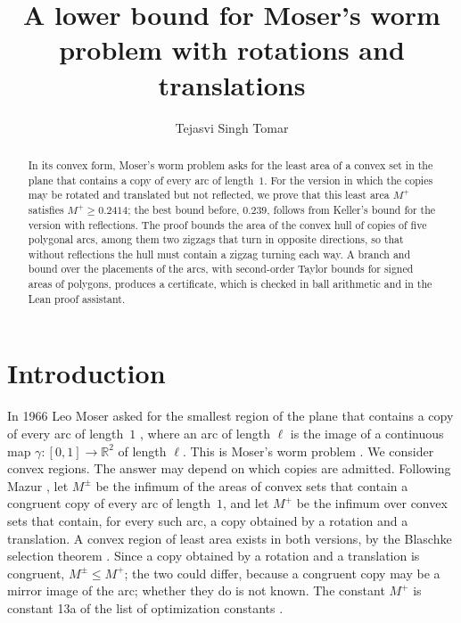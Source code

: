 \documentclass[11pt]{amsart}
\theoremstyle{definition}
\theoremstyle{remark}
\numberwithin{equation}{section}
\newcommand{\R}{\mathbb{R}}
\newcommand{\Mp}{M^{+}}
\newcommand{\Mpm}{M^{\pm}}
\newcommand{\TAU}{0.2414}
\begin{document}
\title[Moser's worm problem with rotations and translations]{A lower bound for Moser's worm problem with rotations and translations}
\author{Tejasvi Singh Tomar}
\renewcommand{\urladdrname}{{\itshape ORCID}}

\begin{abstract}
In its convex form, Moser's worm problem asks for the least area of a convex set in the plane that contains a copy of every arc of length~$1$. For the version in which the copies may be rotated and translated but not reflected, we prove that this least area $\Mp$ satisfies $\Mp\ge\TAU$; the best bound before, $0.239$, follows from Keller's bound for the version with reflections. The proof bounds the area of the convex hull of copies of five polygonal arcs, among them two zigzags that turn in opposite directions, so that without reflections the hull must contain a zigzag turning each way. A branch and bound over the placements of the arcs, with second-order Taylor bounds for signed areas of polygons, produces a certificate, which is checked in ball arithmetic and in the Lean proof assistant.
\end{abstract}

\maketitle

\section{Introduction}\label{sec:intro}

In 1966 Leo Moser asked for the smallest region of the plane that contains a copy of every arc of length~$1$ \cite{Mos66}, where an arc of length $\ell$ is the image of a continuous map $\gamma\colon[0,1]\to\R^2$ of length $\ell$. This is Moser's worm problem \cite{BMP05}. We consider convex regions. The answer may depend on which copies are admitted. Following Mazur \cite{Maz26}, let $\Mpm$ be the infimum of the areas of convex sets that contain a congruent copy of every arc of length~$1$, and let $\Mp$ be the infimum over convex sets that contain, for every such arc, a copy obtained by a rotation and a translation. A convex region of least area exists in both versions, by the Blaschke selection theorem \cite{NPL92,Maz26}. Since a copy obtained by a rotation and a translation is congruent, $\Mpm\le\Mp$; the two could differ, because a congruent copy may be a mirror image of the arc; whether they do is not known. The constant $\Mp$ is constant 13a of the list of optimization constants \cite{Tao26}.
\end{document}
